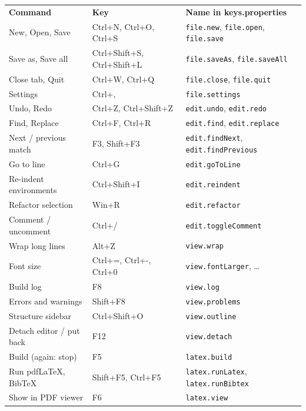 \documentclass[11pt]{article}
\newcommand{\key}[1]{\textsf{#1}}
\begin{document}
    \begin{center}
    \begin{tabular}{lll}
        \textbf{Command} & \textbf{Key} & \textbf{Name in keys.properties}\\[1mm]
        New, Open, Save & \key{Ctrl+N}, \key{Ctrl+O}, \key{Ctrl+S} & \verb+file.new+, \verb+file.open+, \verb+file.save+\\
        Save as, Save all & \key{Ctrl+Shift+S}, \key{Ctrl+Shift+L} & \verb+file.saveAs+, \verb+file.saveAll+\\
        Close tab, Quit & \key{Ctrl+W}, \key{Ctrl+Q} & \verb+file.close+, \verb+file.quit+\\
        Settings & \key{Ctrl+,} & \verb+file.settings+\\
        Undo, Redo & \key{Ctrl+Z}, \key{Ctrl+Shift+Z} & \verb+edit.undo+, \verb+edit.redo+\\
        Find, Replace & \key{Ctrl+F}, \key{Ctrl+R} & \verb+edit.find+, \verb+edit.replace+\\
        Next / previous match & \key{F3}, \key{Shift+F3} & \verb+edit.findNext+, \verb+edit.findPrevious+\\
        Go to line & \key{Ctrl+G} & \verb+edit.goToLine+\\
        Re-indent environments & \key{Ctrl+Shift+I} & \verb+edit.reindent+\\
        Refactor selection & \key{Win+R} & \verb+edit.refactor+\\
        Comment / uncomment & \key{Ctrl+/} & \verb+edit.toggleComment+\\
        Wrap long lines & \key{Alt+Z} & \verb+view.wrap+\\
        Font size & \key{Ctrl+=}, \key{Ctrl+-}, \key{Ctrl+0} & \verb+view.fontLarger+, \ldots\\
        Build log & \key{F8} & \verb+view.log+\\
        Errors and warnings & \key{Shift+F8} & \verb+view.problems+\\
        Structure sidebar & \key{Ctrl+Shift+O} & \verb+view.outline+\\
        Detach editor / put back & \key{F12} & \verb+view.detach+\\
        Build (again: stop) & \key{F5} & \verb+latex.build+\\
        Run pdfLaTeX, BibTeX & \key{Shift+F5}, \key{Ctrl+F5} & \verb+latex.runLatex+, \verb+latex.runBibtex+\\
        Show in PDF viewer & \key{F6} & \verb+latex.view+\\

\end{tabular}
\end{center}
\end{document}
